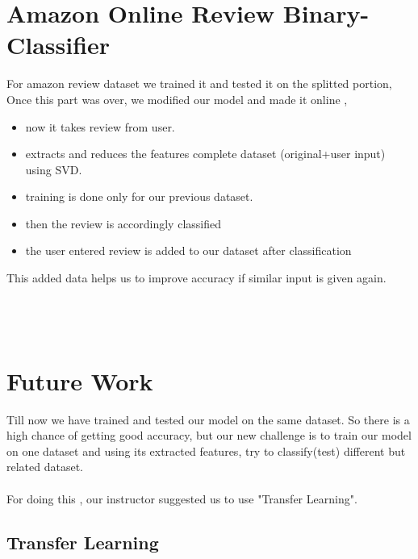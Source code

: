 \documentclass{report}
\begin{document}
\section*{\Huge Amazon Online Review Binary-Classifier}
\Large
For amazon review dataset we trained it and tested it on the splitted portion, 
Once this part was over, we modified our model and made it online ,

\begin{itemize}
\item now it takes review from user.
\item extracts and reduces the features complete dataset (original+user input) using SVD.
\item training is done only for our previous dataset.
\item then the review is accordingly classified
\item the user entered review is added to our dataset after classification
\end{itemize}

This added data helps us to improve accuracy if similar input is given again.\\ \\ \\ \\
\section {\Huge Future Work}
\Large
Till now we have trained and tested our model on the same dataset. So there is a high chance of getting good accuracy, but our new challenge is to train our model on one dataset and using its extracted features, try to classify(test) different but related dataset.\\ \\
For doing this , our instructor suggested us to use "Transfer Learning".\\

\subsection{\huge Transfer Learning}
\end{document}
